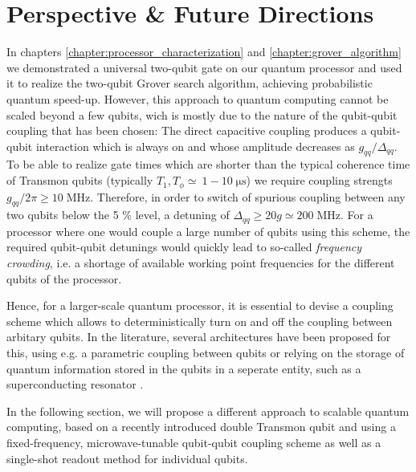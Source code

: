 \chapter{Perspective \& Future Directions}

In chapters \ref{chapter:processor_characterization} and \ref{chapter:grover_algorithm} we demonstrated a universal two-qubit gate on our quantum processor and used it to realize the two-qubit Grover search algorithm, achieving probabilistic quantum speed-up. However, this approach to quantum computing cannot be scaled beyond a few qubits, wich is mostly due to the nature of the qubit-qubit coupling that has been chosen: The direct capacitive coupling produces a qubit-qubit interaction which is always on and whose amplitude decreases as $g_{qq}/\Delta_{qq}$. To be able to realize gate times which are shorter than the typical coherence time of Transmon qubits (typically $T_1,T_\phi \simeq\ 1-10 \;\mathrm{\mu s}$) we require coupling strengts $g_{qq}/2\pi \ge 10\;\mathrm{MHz}$. Therefore, in order to switch of spurious coupling between any two qubits below the 5 \% level, a detuning of $\Delta_{qq}\ge 20g \simeq 200\;\mathrm{MHz}$. For a processor where one would couple a large number of qubits using this scheme, the required qubit-qubit detunings would quickly lead to so-called {\it frequency crowding}, i.e. a shortage of available working point frequencies for the different qubits of the processor.

\smallskip

Hence, for a larger-scale quantum processor, it is essential to devise a coupling scheme which allows to deterministically turn on and off the coupling between arbitary qubits. In the literature, several architectures have been proposed for this, using e.g. a parametric coupling between qubits \citep{bertet_parametric_2006} or relying on the storage of quantum information stored in the qubits in a seperate entity, such as a superconducting resonator \citep{galiautdinov_resonatorzero-qubit_2012,mariantoni_implementing_2011}.

\smallskip

In the following section, we will propose a different approach to scalable quantum computing, based on a recently introduced double Transmon qubit \citep{gambetta_superconducting_2011,srinivasan_tunable_2011} and using a fixed-frequency, microwave-tunable qubit-qubit coupling scheme as well as a single-shot readout method for individual qubits.

\smallskip

